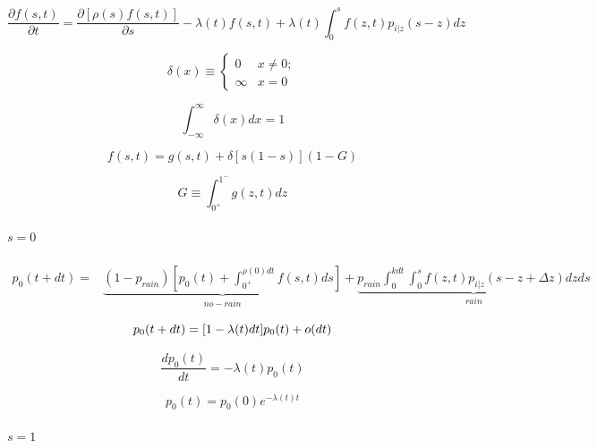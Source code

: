 \documentclass[draft,wrr]{AGUTeX}
\begin{document}
\begin{article}
\begin{equation}
\label{basic3}
 \frac{\partial{f(s,t)}}{\partial t}=\frac{\partial{[\rho(s)f(s,t)]}}{\partial s}-\lambda(t)f(s,t)+\lambda(t)\int_{0}^{s} f(z,t)p_{i|z}(s-z)dz
 \end{equation}
 
 \begin{equation}
 \delta(x)\equiv
 \begin{cases}
 0&x\neq0;\\\infty&x=0
 \end{cases}
 \end{equation}
 
 \begin{equation}
 \int_{-\infty}^{\infty} \delta(x)dx=1
 \end{equation}
 
 \begin{equation}
 f(s,t)=g(s,t)+\delta[s(1-s)](1-G)
 \end{equation} 
 
 \begin{equation}
G\equiv\int_{0^+}^{1^-} g(z,t)dz
 \end{equation}

\paragraph{$s=0$}
 
\begin{equation}
\label{basic00}
\begin{split}
p_0(t+dt)=&\underbrace{(1-p_{rain})[p_0(t)+\int_{0^{+}}^{\rho (0)dt} f(s,t)ds]}_{no-rain} +\underbrace{p_{rain} \int_{0}^{kdt}\int_{0}^{s} f(z,t)p_{i|z}(s-z+\Delta z)dzds}_{rain}
\end{split}
\end{equation}
 
 \begin{equation}
 p_0(t+dt)\\=[1-\lambda(t)dt]p_0(t)+o(dt)
 \end{equation} 
 
 \begin{equation}
 \frac{dp_0(t)}{dt}=-\lambda(t) p_0(t)
 \end{equation}
 
 \begin{equation}
 p_0(t)=p_0(0)e^{-\lambda(t) t}
 \end{equation}

 


\paragraph{$s=1$ } 
 

\end{article}
\end{document}
